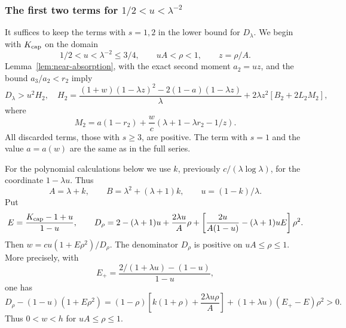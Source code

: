 \subsubsection{The first two terms for \texorpdfstring{$1/2<u<\lambda^{-2}$}{1/2 < u < lambda^(-2)}}
It suffices to keep the terms with $s=1,2$ in the lower bound for $D_\lambda$. We begin with $K_{\rm cap}$ on the domain
\begin{equation}\label{eq:near-high-u-domain}
 1/2<u<\lambda^{-2}\le3/4,\qquad uA<\rho<1,\qquad z=\rho/A.
\end{equation}
Lemma~\ref{lem:near-absorption}, with the exact second moment $a_2=uz$, and the bound $a_3/a_2<r_2$ imply
\begin{equation}\label{eq:near-H2}
 D_\lambda>u^2H_2,
 \quad H_2=\frac{(1+w)(1-\lambda z)^2-2(1-a)(1-\lambda z)}\lambda
          +2\lambda z^2[B_2+2L_2M_2],
\end{equation}
where
\[
 M_2=a(1-r_2)+\frac wc(\lambda+1-\lambda r_2-1/z).
\]
All discarded terms, those with $s\ge3$, are positive. The term with $s=1$ and the value $a=a(w)$ are the same as in the full series.

For the polynomial calculations below we use $k$, previously $c/(\lambda\log\lambda)$, for the coordinate $1-\lambda u$. Thus
\[
 A=\lambda+k,\qquad B=\lambda^2+(\lambda+1)k,
 \qquad u=(1-k)/\lambda.
\]
Put
\begin{equation}\label{eq:near-high-denominator}
 E=\frac{K_{\rm cap}-1+u}{1-u},\qquad
 D_\rho=2-(\lambda+1)u+\frac{2\lambda u}{A}\rho
 +\left[\frac{2u}{A(1-u)}-(\lambda+1)uE\right]\rho^2.
\end{equation}
Then $w=cu(1+E\rho^2)/D_\rho$. The denominator $D_\rho$ is positive on $uA\le\rho\le1$. More precisely, with
\[
 E_+=\frac{2/(1+\lambda u)-(1-u)}{1-u},
\]
one has
\begin{equation}\label{eq:near-high-denominator-gap}
 D_\rho-(1-u)(1+E\rho^2)
 =(1-\rho)\left[k(1+\rho)+\frac{2\lambda u\rho}{A}\right]
 +(1+\lambda u)(E_+-E)\rho^2>0.
\end{equation}
Thus $0<w<h$ for $uA\le\rho\le1$.

